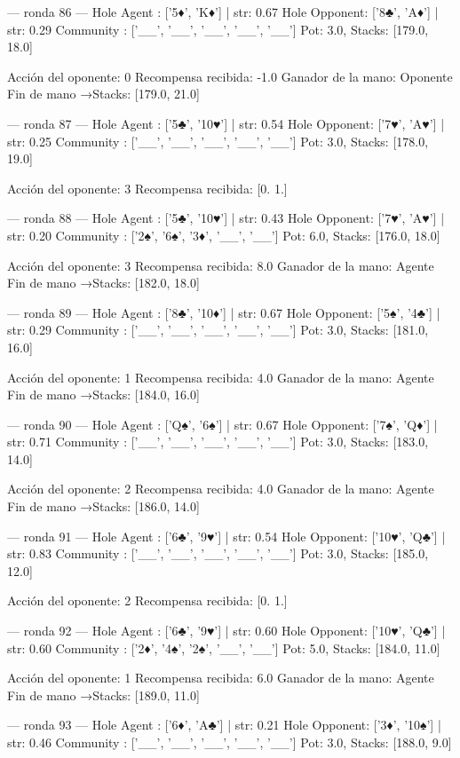 --- ronda 86 ---
Hole Agent : ['5♦', 'K♦'] | str: 0.67
Hole Opponent: ['8♣', 'A♦'] | str: 0.29
Community  : ['__', '__', '__', '__', '__']
Pot: 3.0, Stacks: [179.0, 18.0]

Acción del oponente: 0
Recompensa recibida: -1.0
Ganador de la mano: Oponente
Fin de mano →Stacks: [179.0, 21.0]


--- ronda 87 ---
Hole Agent : ['5♣', '10♥'] | str: 0.54
Hole Opponent: ['7♥', 'A♥'] | str: 0.25
Community  : ['__', '__', '__', '__', '__']
Pot: 3.0, Stacks: [178.0, 19.0]

Acción del oponente: 3
Recompensa recibida: [0. 1.]

--- ronda 88 ---
Hole Agent : ['5♣', '10♥'] | str: 0.43
Hole Opponent: ['7♥', 'A♥'] | str: 0.20
Community  : ['2♠', '6♠', '3♦', '__', '__']
Pot: 6.0, Stacks: [176.0, 18.0]

Acción del oponente: 3
Recompensa recibida: 8.0
Ganador de la mano: Agente
Fin de mano →Stacks: [182.0, 18.0]


--- ronda 89 ---
Hole Agent : ['8♣', '10♦'] | str: 0.67
Hole Opponent: ['5♠', '4♣'] | str: 0.29
Community  : ['__', '__', '__', '__', '__']
Pot: 3.0, Stacks: [181.0, 16.0]

Acción del oponente: 1
Recompensa recibida: 4.0
Ganador de la mano: Agente
Fin de mano →Stacks: [184.0, 16.0]


--- ronda 90 ---
Hole Agent : ['Q♠', '6♠'] | str: 0.67
Hole Opponent: ['7♠', 'Q♦'] | str: 0.71
Community  : ['__', '__', '__', '__', '__']
Pot: 3.0, Stacks: [183.0, 14.0]

Acción del oponente: 2
Recompensa recibida: 4.0
Ganador de la mano: Agente
Fin de mano →Stacks: [186.0, 14.0]


--- ronda 91 ---
Hole Agent : ['6♣', '9♥'] | str: 0.54
Hole Opponent: ['10♥', 'Q♣'] | str: 0.83
Community  : ['__', '__', '__', '__', '__']
Pot: 3.0, Stacks: [185.0, 12.0]

Acción del oponente: 2
Recompensa recibida: [0. 1.]

--- ronda 92 ---
Hole Agent : ['6♣', '9♥'] | str: 0.60
Hole Opponent: ['10♥', 'Q♣'] | str: 0.60
Community  : ['2♦', '4♠', '2♠', '__', '__']
Pot: 5.0, Stacks: [184.0, 11.0]

Acción del oponente: 1
Recompensa recibida: 6.0
Ganador de la mano: Agente
Fin de mano →Stacks: [189.0, 11.0]


--- ronda 93 ---
Hole Agent : ['6♦', 'A♣'] | str: 0.21
Hole Opponent: ['3♦', '10♠'] | str: 0.46
Community  : ['__', '__', '__', '__', '__']
Pot: 3.0, Stacks: [188.0, 9.0]

